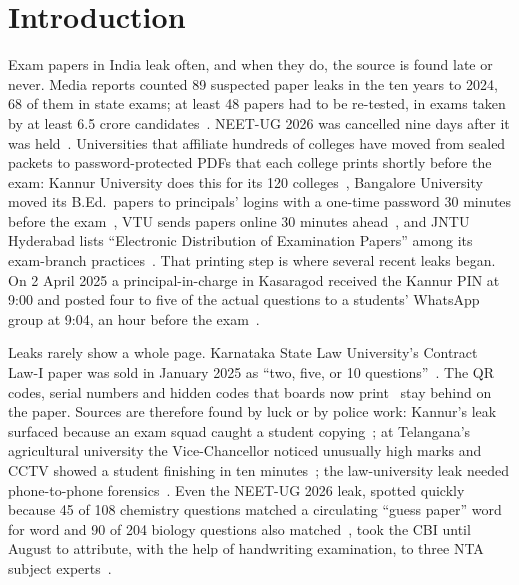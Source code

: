 \documentclass[10pt,a4paper]{article}
\theoremstyle{remark}
\begin{document}
\vspace{2pt}
\noindent{\color{rule}\rule{\linewidth}{0.6pt}}

\section{Introduction}

Exam papers in India leak often, and when they do, the source is found late or never. Media reports counted 89 suspected paper leaks in the ten years to 2024, 68 of them in state exams; at least 48 papers had to be re-tested, in exams taken by at least 6.5 crore candidates~\citep{newslaundry2024}. NEET-UG 2026 was cancelled nine days after it was held~\citep{moneylife2026}. Universities that affiliate hundreds of colleges have moved from sealed packets to password-protected PDFs that each college prints shortly before the exam: Kannur University does this for its 120 colleges~\citep{southfirst2025kannur}, Bangalore University moved its B.Ed.\ papers to principals' logins with a one-time password 30 minutes before the exam~\citep{etv2025bu}, VTU sends papers online 30 minutes ahead~\citep{udayavani2018vtu}, and JNTU Hyderabad lists \enquote{Electronic Distribution of Examination Papers} among its exam-branch practices~\citep{jntuh2019aqar}. That printing step is where several recent leaks began. On 2 April 2025 a principal-in-charge in Kasaragod received the Kannur PIN at 9:00 and posted four to five of the actual questions to a students' WhatsApp group at 9:04, an hour before the exam~\citep{onmanorama2025b}.

Leaks rarely show a whole page. Karnataka State Law University's Contract Law-I paper was sold in January 2025 as \enquote{two, five, or 10 questions}~\citep{dh2025kslu}. The QR codes, serial numbers and hidden codes that boards now print~\citep{tribune2023haryana,dh2024wbbse,sakshi2025tsssc,nios2026} stay behind on the paper. Sources are therefore found by luck or by police work: Kannur's leak surfaced because an exam squad caught a student copying~\citep{onmanorama2025b}; at Telangana's agricultural university the Vice-Chancellor noticed unusually high marks and CCTV showed a student finishing in ten minutes~\citep{siasat2026pjtsau}; the law-university leak needed phone-to-phone forensics~\citep{dh2025kslu}. Even the NEET-UG 2026 leak, spotted quickly because 45 of 108 chemistry questions matched a circulating \enquote{guess paper} word for word and 90 of 204 biology questions also matched~\citep{theweek2026neet}, took the CBI until August to attribute, with the help of handwriting examination, to three NTA subject experts~\citep{tribune2026cbi}.
\end{document}
